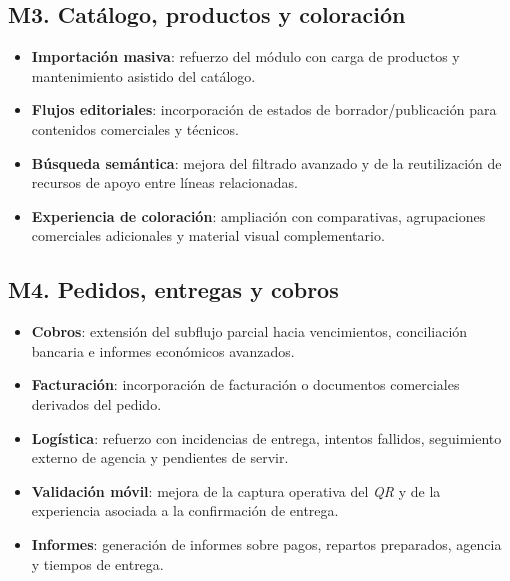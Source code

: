 \subsection*{M3. Catálogo, productos y coloración}
\begin{itemize}
    \item \textbf{Importación masiva}: refuerzo del módulo con carga de productos y mantenimiento asistido del catálogo.
    \item \textbf{Flujos editoriales}: incorporación de estados de borrador/publicación para contenidos comerciales y técnicos.
    \item \textbf{Búsqueda semántica}: mejora del filtrado avanzado y de la reutilización de recursos de apoyo entre líneas relacionadas.
    \item \textbf{Experiencia de coloración}: ampliación con comparativas, agrupaciones comerciales adicionales y material visual complementario.
\end{itemize}

\subsection*{M4. Pedidos, entregas y cobros}
\begin{itemize}
    \item \textbf{Cobros}: extensión del subflujo parcial hacia vencimientos, conciliación bancaria e informes económicos avanzados.
    \item \textbf{Facturación}: incorporación de facturación o documentos comerciales derivados del pedido.
    \item \textbf{Logística}: refuerzo con incidencias de entrega, intentos fallidos, seguimiento externo de agencia y pendientes de servir.
    \item \textbf{Validación móvil}: mejora de la captura operativa del \textit{QR} y de la experiencia asociada a la confirmación de entrega.
    \item \textbf{Informes}: generación de informes sobre pagos, repartos preparados, agencia y tiempos de entrega.
\end{itemize}

